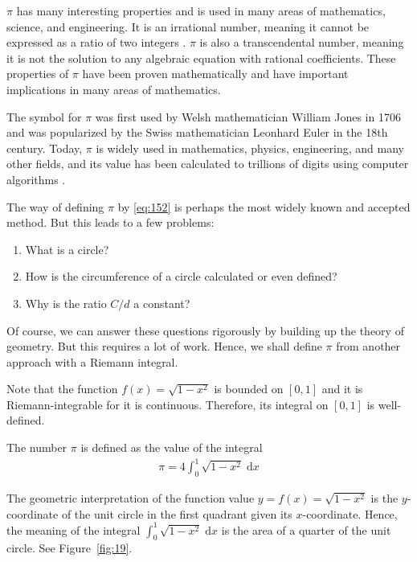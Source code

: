 \documentclass[thmcnt=section, 12pt]{my-elegantbook}
\begin{document}
$\pi$ has many interesting properties and is used in many areas of mathematics, science, and engineering.
It is an irrational number, meaning it cannot be expressed
as a ratio of two integers \cite{arndtPiunleashed2001}.
$\pi$ is also a transcendental number,
meaning it is not the solution to any algebraic equation
with rational coefficients.
These properties of $\pi$ have been proven mathematically
and have important implications in many areas of mathematics.

The symbol for $\pi$ was first used by Welsh mathematician
William Jones in 1706
and was popularized by the Swiss mathematician Leonhard Euler
in the 18th century.
Today, $\pi$ is widely used
in mathematics, physics, engineering,
and many other fields, and its value has been
calculated to trillions of digits
using computer algorithms \cite{weissteinPi}.

The way of defining $\pi$ by \eqref{eq:152}
is perhaps the most widely known and accepted method.
But this leads to a few problems:
\begin{enumerate}
    \item What is a circle?
    \item How is the circumference of a circle calculated
          or even defined?
    \item Why is the ratio $C / d$ a constant?
\end{enumerate}
Of course, we can answer these questions rigorously
by building up the theory of geometry.
But this requires a lot of work.
Hence, we shall define $\pi$ from another approach
with a Riemann integral.

Note that the function $f(x) = \sqrt{1 - x^2}$
is bounded on $[0, 1]$ and it is Riemann-integrable
for it is continuous.
Therefore, its integral on $[0, 1]$ is well-defined.

\begin{definition} \label{def:9}
    The number $\pi$\index{$\pi$} is defined as the
    value of the integral
    \begin{align*}
        \pi = 4 \int_0^1 \sqrt{1 - x^2} \; \mathrm{d} x
    \end{align*}
\end{definition}

The geometric interpretation of the
function value $y = f(x) = \sqrt{1 - x^2}$
is the $y$-coordinate of the unit circle
in the first quadrant given its $x$-coordinate.
Hence, the meaning of the
integral $\int_0^1 \sqrt{1-x^2} \; \mathrm{d} x$
is the area of a quarter of the unit circle.
See Figure~\ref{fig:19}.
\end{document}
